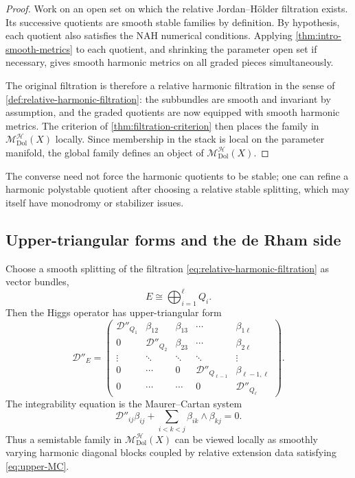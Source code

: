 \documentclass[11pt,reqno]{amsart}
\theoremstyle{definition}
\theoremstyle{remark}
\newcommand{\cD}{\mathcal D}
\newcommand{\cH}{\mathcal H}
\newcommand{\Dol}{\mathrm{Dol}}
\newcommand{\MHDol}{\mathscr M^{\cH}_{\Dol}}
\begin{document}
\begin{proof}
Work on an open set on which the relative Jordan--H\"older filtration exists.  Its successive quotients are smooth stable families by definition.  By hypothesis, each quotient also satisfies the NAH numerical conditions.  Applying \cref{thm:intro-smooth-metrics} to each quotient, and shrinking the parameter open set if necessary, gives smooth harmonic metrics on all graded pieces simultaneously.

The original filtration is therefore a relative harmonic filtration in the sense of \cref{def:relative-harmonic-filtration}: the subbundles are smooth and invariant by assumption, and the graded quotients are now equipped with smooth harmonic metrics.  The criterion of \cref{thm:filtration-criterion} then places the family in $\MHDol(X)$ locally.  Since membership in the stack is local on the parameter manifold, the global family defines an object of $\MHDol(X)$.
\end{proof}

The converse need not force the harmonic quotients to be stable; one can refine a harmonic polystable quotient after choosing a relative stable splitting, which may itself have monodromy or stabilizer issues.

\subsection{Upper-triangular forms and the de Rham side}

Choose a smooth splitting of the filtration \eqref{eq:relative-harmonic-filtration} as vector bundles,
\[
  E\cong\bigoplus_{i=1}^\ell Q_i.
\]
Then the Higgs operator has upper-triangular form
\begin{equation}\label{eq:upper-triangular-D}
  \cD''_E=
  \begin{pmatrix}
    \cD''_{Q_1} & \beta_{12} & \beta_{13} & \cdots & \beta_{1\ell}\\
    0 & \cD''_{Q_2} & \beta_{23} & \cdots & \beta_{2\ell}\\
    \vdots & \ddots & \ddots & \ddots & \vdots\\
    0 & \cdots & 0 & \cD''_{Q_{\ell-1}} & \beta_{\ell-1,\ell}\\
    0 & \cdots & \cdots & 0 & \cD''_{Q_\ell}
  \end{pmatrix}.
\end{equation}
The integrability equation is the Maurer--Cartan system
\begin{equation}\label{eq:upper-MC}
  \cD''_{ij}\beta_{ij}
  +\sum_{i<k<j}\beta_{ik}\wedge\beta_{kj}=0.
\end{equation}
Thus a semistable family in $\MHDol(X)$ can be viewed locally as smoothly varying harmonic diagonal blocks coupled by relative extension data satisfying \eqref{eq:upper-MC}.
\end{document}
